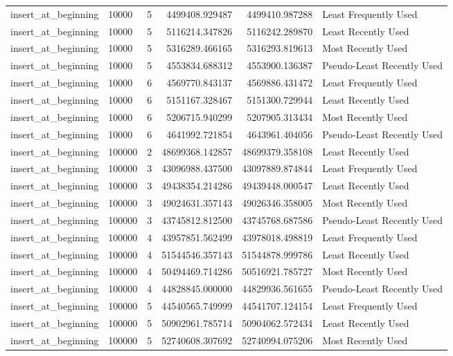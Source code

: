 \begin{tabular}{llrrrl}
insert_at_beginning & 10000 & 5 & 4499408.929487 & 4499410.987288 & Least Frequently Used \\
insert_at_beginning & 10000 & 5 & 5116214.347826 & 5116242.289870 & Least Recently Used \\
insert_at_beginning & 10000 & 5 & 5316289.466165 & 5316293.819613 & Most Recently Used \\
insert_at_beginning & 10000 & 5 & 4553834.688312 & 4553900.136387 & Pseudo-Least Recently Used \\
insert_at_beginning & 10000 & 6 & 4569770.843137 & 4569886.431472 & Least Frequently Used \\
insert_at_beginning & 10000 & 6 & 5151167.328467 & 5151300.729944 & Least Recently Used \\
insert_at_beginning & 10000 & 6 & 5206715.940299 & 5207905.313434 & Most Recently Used \\
insert_at_beginning & 10000 & 6 & 4641992.721854 & 4643961.404056 & Pseudo-Least Recently Used \\
insert_at_beginning & 100000 & 2 & 48699368.142857 & 48699379.358108 & Least Recently Used \\
insert_at_beginning & 100000 & 3 & 43096988.437500 & 43097889.874844 & Least Frequently Used \\
insert_at_beginning & 100000 & 3 & 49438354.214286 & 49439448.000547 & Least Recently Used \\
insert_at_beginning & 100000 & 3 & 49024631.357143 & 49026346.358005 & Most Recently Used \\
insert_at_beginning & 100000 & 3 & 43745812.812500 & 43745768.687586 & Pseudo-Least Recently Used \\
insert_at_beginning & 100000 & 4 & 43957851.562499 & 43978018.498819 & Least Frequently Used \\
insert_at_beginning & 100000 & 4 & 51544546.357143 & 51544878.999786 & Least Recently Used \\
insert_at_beginning & 100000 & 4 & 50494469.714286 & 50516921.785727 & Most Recently Used \\
insert_at_beginning & 100000 & 4 & 44828845.000000 & 44829936.561655 & Pseudo-Least Recently Used \\
insert_at_beginning & 100000 & 5 & 44540565.749999 & 44541707.124154 & Least Frequently Used \\
insert_at_beginning & 100000 & 5 & 50902961.785714 & 50904062.572434 & Least Recently Used \\
insert_at_beginning & 100000 & 5 & 52740608.307692 & 52740994.075206 & Most Recently Used \\

\end{tabular}

